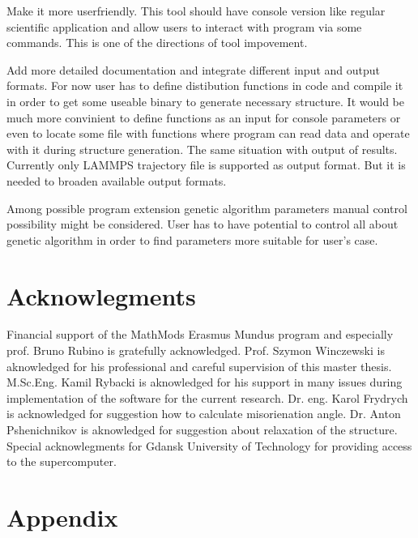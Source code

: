 \documentclass[12pt]{report}
\begin{document}
Make it more userfriendly. This tool should have console version like regular scientific application and allow users to interact with program via some commands. This is one of the directions of tool impovement.

Add more detailed documentation and integrate different input and output formats. For now user has to define distibution functions in code and compile it in order to get some useable binary to generate necessary structure. It would be much more convinient to define functions as an input for console parameters or even to locate some file with functions where program can read data and operate with it during structure generation. The same situation with output of results. Currently only LAMMPS trajectory file is supported as output format. But it is needed to broaden available output formats.

Among possible program extension genetic algorithm parameters manual control possibility might be considered. User has to have potential to control all about genetic algorithm in order to find parameters more suitable for user's case.

\section{Acknowlegments}

Financial support of the MathMods Erasmus Mundus program and especially prof. Bruno Rubino is gratefully acknowledged. Prof. Szymon Winczewski is aknowledged for his professional and careful supervision of this master thesis. M.Sc.Eng. Kamil Rybacki is aknowledged for his support in many issues during implementation of the software for the current research. Dr. eng. Karol Frydrych is acknowledged for suggestion how to calculate misorienation angle. Dr. Anton Pshenichnikov is aknowledged for suggestion about relaxation of the structure. Special acknowlegments for Gdansk University of Technology for providing access to the supercomputer.

\goodbreak
\section{Appendix}
\end{document}
